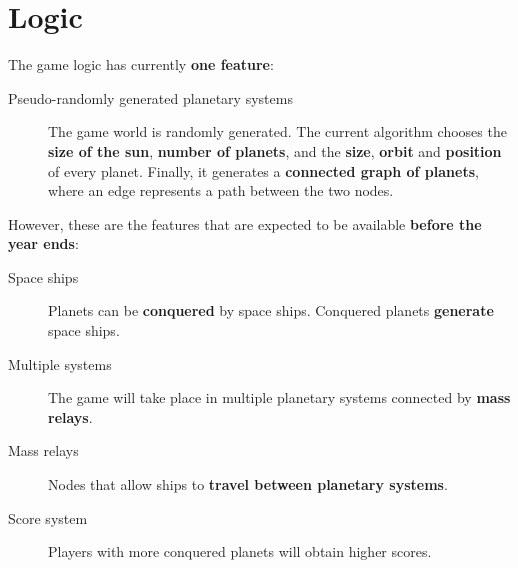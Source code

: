 \documentclass[a4paper,11pt,titlepage,abstract,numbers=noenddot,automark,mnsy,intlimits,rgb,dvipsnames]{report}
\begin{document}
\section{Logic}
\indent
The game logic has currently \textbf{one feature}:
\begin{description}
\item[Pseudo-randomly generated planetary systems]
The game world is randomly generated. The current algorithm
  chooses the \textbf{size of the sun}, \textbf{number of planets}, and the \textbf{size}, \textbf{orbit} and \textbf{position} of every planet.
  Finally, it generates a \textbf{connected graph of planets}, where an edge represents a path between the two nodes.
\end{description}
However, these are the features that are expected to be available \textbf{before the year ends}:
\begin{description}
\item[Space ships]
Planets can be \textbf{conquered} by space ships. Conquered planets \textbf{generate} space ships.
\item[Multiple systems]
The game will take place in multiple planetary systems connected by \textbf{mass relays}.
\item[Mass relays]
Nodes that allow ships to \textbf{travel between planetary systems}.
\item[Score system]
Players with more conquered planets will obtain higher scores.
\end{description}
\clearpage
\end{document}
